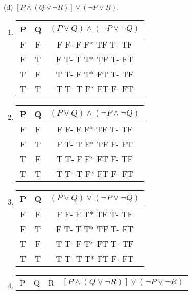 \documentclass{article}
\begin{document}
(d) $[P \land (Q \lor \neg R)] \lor (\neg P \lor R)$.
\begin{enumerate}[label=(\alph*)]
  \item 
\begin{center}
 \begin{tabular}{||c c c ||} 
 \hline
 P & Q & $(P\lor Q) \land (\neg P \lor \neg Q) $ \\ [0.5ex] 
 \hline\hline
 F & F & F F- F F* TF T- TF\\ 
 \hline
 F & T & F T- T T* TF T- FT\\
 \hline
 T & F & T T- F T* FT T- TF\\
 \hline
 T & T & T T- T F* FT F- FT\\ [1ex] 
 \hline
\end{tabular}
\end{center}
  \item 
\begin{center}
 \begin{tabular}{||c c c ||} 
 \hline
 P & Q & $(P\lor Q) \land (\neg P \land \neg Q) $ \\ [0.5ex] 
 \hline\hline
 F & F & F F- F F* TF T- TF\\ 
 \hline
 F & T & F T- T F* TF F- FT\\
 \hline
 T & F & T T- F F* FT F- TF\\
 \hline
 T & T & T T- T F* FT F- FT\\ [1ex] 
 \hline
\end{tabular}
\end{center}
  \item 
\begin{center}
 \begin{tabular}{||c c c ||} 
 \hline
 P & Q & $(P\lor Q) \lor (\neg P \lor \neg Q) $ \\ [0.5ex] 
 \hline\hline
 F & F & F F- F T* TF T- TF\\ 
 \hline
 F & T & F T- T T* TF T- FT\\
 \hline
 T & F & T T- F T* FT T- TF\\
 \hline
 T & T & T T- T T* FT F- FT\\ [1ex] 
 \hline
\end{tabular}
\end{center}
  \item 
\begin{center}
 \begin{tabular}{||c c c c ||} 
 \hline
 P & Q & R & $[P\land (Q \lor \neg R)]\lor (\neg P \lor \neg R) $ \\ [0.5ex] 

\end{tabular}
\end{center}
\end{enumerate}
\end{document}
